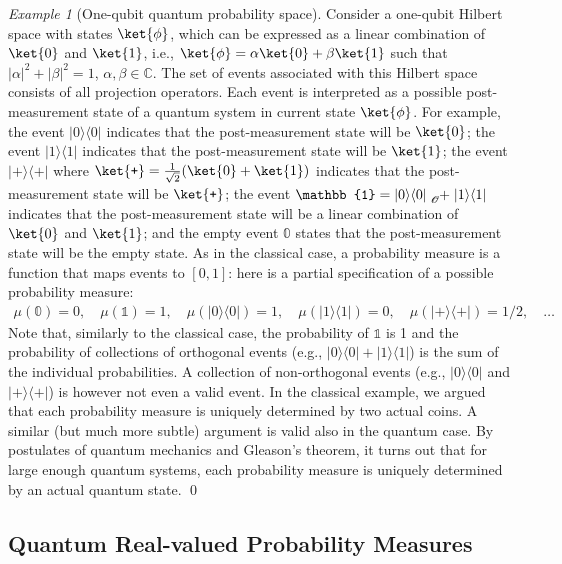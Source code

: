 \documentclass{article}
\theoremstyle{remark}
\newtheorem{example}{Example}
\newcommand{\proj}[1]{|#1 \rangle\langle #1 |}
\newcommand{\ps}{\texttt{+}}
\def\C{{\mathbb{C}}}
\begin{document}
\begin{example}[One-qubit quantum probability space] Consider
a one-qubit Hilbert space with states $\ket{\phi}$, which can be
expressed as a linear combination of $\ket{0}$ and $\ket{1}$, i.e.,
$\ket{\phi}=\alpha\ket{0}+\beta\ket{1}$ such that $|\alpha|^{2}+|\beta|^{2}=1$,
$\alpha,\beta\in\C$. The set of events associated with this Hilbert
space consists of all projection operators. Each event is interpreted
as a possible post-measurement state of a quantum system in current
state $\ket{\phi}$. For example, the event $\proj{0}$ indicates
that the post-measurement state will be $\ket{0}$; the event $\proj{1}$
indicates that the post-measurement state will be $\ket{1}$; the
event $\proj{\ps}$ where $\ket{\ps}=\frac{1}{\sqrt{2}}(\ket{0}+\ket{1})$
indicates that the post-measurement state will be $\ket{\ps}$; the
event $\mathbb{1}=\proj{0}\tensor*[_{\mathscr{O}}]{+}{}\proj{1}$
indicates that the post-measurement state will be a linear combination
of $\ket{0}$ and $\ket{1}$; and the empty event $\mathbb{0}$ states
that the post-measurement state will be the empty state. As in the
classical case, a probability measure is a function that maps events
to $[0,1]$: here is a partial specification of a possible probability
measure: 
\[
\begin{array}{rcl}
\mu\left(\mathbb{0}\right)=0,\quad\mu\left(\mathbb{1}\right)=1,\quad\mu\left(\proj{0}\right)=1,\quad\mu\left(\proj{1}\right)=0,\quad\mu\left(\proj{\ps}\right)=1/2,\quad\ldots\end{array}
\]
Note that, similarly to the classical case, the probability of $\mathbb{1}$
is 1 and the probability of collections of orthogonal events (e.g.,
$\proj{0}+\proj{1}$) is the sum of the individual probabilities.
A collection of non-orthogonal events (e.g., $\proj{0}$ and $\proj{\ps}$)
is however not even a valid event. In the classical example, we argued
that each probability measure is uniquely determined by two actual
coins. A similar (but much more subtle) argument is valid also in
the quantum case. By postulates of quantum mechanics and Gleason's
theorem, it turns out that for large enough quantum systems, each
probability measure is uniquely determined by an actual quantum state.
\qed\end{example}



\subsection{Quantum Real-valued Probability Measures}
\end{document}
